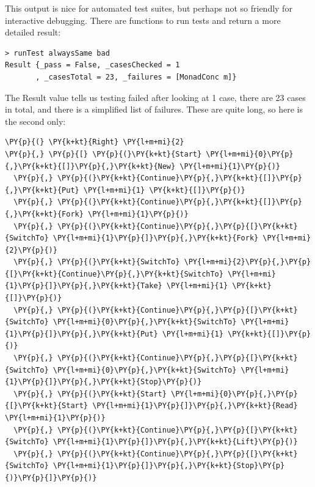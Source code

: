 This output is nice for automated test suites, but perhaps not so
friendly for interactive debugging. There are functions to run tests
and return a more detailed result:

\begin{verbatim}
> runTest alwaysSame bad
Result {_pass = False, _casesChecked = 1
       , _casesTotal = 23, _failures = [MonadConc m]}
\end{verbatim}

The Result value tells us testing failed after looking at 1 case,
there are 23 cases in total, and there is a simplified list of
failures. These are quite long, so here is the second only:


\begin{Verbatim}[commandchars=\\\{\}]
\PY{p}{(} \PY{k+kt}{Right} \PY{l+m+mi}{2}
\PY{p}{,} \PY{p}{[} \PY{p}{(}\PY{k+kt}{Start} \PY{l+m+mi}{0}\PY{p}{,}\PY{k+kt}{[]}\PY{p}{,}\PY{k+kt}{New} \PY{l+m+mi}{1}\PY{p}{)}
  \PY{p}{,} \PY{p}{(}\PY{k+kt}{Continue}\PY{p}{,}\PY{k+kt}{[]}\PY{p}{,}\PY{k+kt}{Put} \PY{l+m+mi}{1} \PY{k+kt}{[]}\PY{p}{)}
  \PY{p}{,} \PY{p}{(}\PY{k+kt}{Continue}\PY{p}{,}\PY{k+kt}{[]}\PY{p}{,}\PY{k+kt}{Fork} \PY{l+m+mi}{1}\PY{p}{)}
  \PY{p}{,} \PY{p}{(}\PY{k+kt}{Continue}\PY{p}{,}\PY{p}{[}\PY{k+kt}{SwitchTo} \PY{l+m+mi}{1}\PY{p}{]}\PY{p}{,}\PY{k+kt}{Fork} \PY{l+m+mi}{2}\PY{p}{)}
  \PY{p}{,} \PY{p}{(}\PY{k+kt}{SwitchTo} \PY{l+m+mi}{2}\PY{p}{,}\PY{p}{[}\PY{k+kt}{Continue}\PY{p}{,}\PY{k+kt}{SwitchTo} \PY{l+m+mi}{1}\PY{p}{]}\PY{p}{,}\PY{k+kt}{Take} \PY{l+m+mi}{1} \PY{k+kt}{[]}\PY{p}{)}
  \PY{p}{,} \PY{p}{(}\PY{k+kt}{Continue}\PY{p}{,}\PY{p}{[}\PY{k+kt}{SwitchTo} \PY{l+m+mi}{0}\PY{p}{,}\PY{k+kt}{SwitchTo} \PY{l+m+mi}{1}\PY{p}{]}\PY{p}{,}\PY{k+kt}{Put} \PY{l+m+mi}{1} \PY{k+kt}{[]}\PY{p}{)}
  \PY{p}{,} \PY{p}{(}\PY{k+kt}{Continue}\PY{p}{,}\PY{p}{[}\PY{k+kt}{SwitchTo} \PY{l+m+mi}{0}\PY{p}{,}\PY{k+kt}{SwitchTo} \PY{l+m+mi}{1}\PY{p}{]}\PY{p}{,}\PY{k+kt}{Stop}\PY{p}{)}
  \PY{p}{,} \PY{p}{(}\PY{k+kt}{Start} \PY{l+m+mi}{0}\PY{p}{,}\PY{p}{[}\PY{k+kt}{Start} \PY{l+m+mi}{1}\PY{p}{]}\PY{p}{,}\PY{k+kt}{Read} \PY{l+m+mi}{1}\PY{p}{)}
  \PY{p}{,} \PY{p}{(}\PY{k+kt}{Continue}\PY{p}{,}\PY{p}{[}\PY{k+kt}{SwitchTo} \PY{l+m+mi}{1}\PY{p}{]}\PY{p}{,}\PY{k+kt}{Lift}\PY{p}{)}
  \PY{p}{,} \PY{p}{(}\PY{k+kt}{Continue}\PY{p}{,}\PY{p}{[}\PY{k+kt}{SwitchTo} \PY{l+m+mi}{1}\PY{p}{]}\PY{p}{,}\PY{k+kt}{Stop}\PY{p}{)}\PY{p}{]}\PY{p}{)}
\end{Verbatim}

